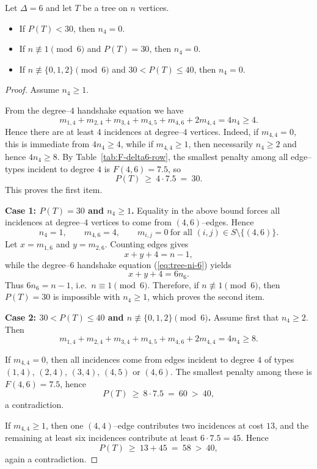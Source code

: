 \documentclass[10pt,a4paper]{amsart}
\begin{document}
\begin{lemma}
\label{lem:no4-threshold}
Let $\Delta=6$ and let $T$ be a tree on $n$ vertices.

\begin{itemize}
\item If $P(T)<30$, then $n_4=0$.
\item If $n\not\equiv 1 \pmod 6$ and $P(T)=30$, then $n_4=0$.
\item If $n\not\equiv \{0,1,2\} \pmod 6$ and $30<P(T)\le 40$, then $n_4=0$.
\end{itemize}
\end{lemma}

\begin{proof}
Assume $n_4\ge 1$.

From the degree--$4$ handshake equation we have
\[
m_{1,4}+m_{2,4}+m_{3,4}+m_{4,5}+m_{4,6}+2m_{4,4}=4n_4 \ge 4 .
\]
Hence there are at least $4$ incidences at degree--$4$ vertices. 
Indeed, if $m_{4,4}=0$, this is immediate from $4n_4\ge 4$, while if
$m_{4,4}\ge 1$, then necessarily $n_4\ge 2$ and hence $4n_4\ge 8$.
By Table~\ref{tab:F-delta6-row}, the smallest penalty among all edge--types
incident to degree $4$ is $F(4,6)=7.5$, so
\[
P(T)\ \ge\ 4\cdot 7.5 \ =\ 30 .
\]
This proves the first item.

\medskip
\noindent
\textbf{Case 1: $P(T)=30$ and $n_4\ge 1$.}  
Equality in the above bound forces all incidences at degree--$4$ vertices
to come from $(4,6)$--edges. Hence
\[
n_4=1, \qquad m_{4,6}=4, \qquad m_{i,j}=0 \ \text{for all }(i,j)\in S\setminus\{(4,6)\}.
\]
Let $x=m_{1,6}$ and $y=m_{2,6}$.  
Counting edges gives
\[
x+y+4=n-1 ,
\]
while the degree--$6$ handshake equation (\ref{eq:tree-ni-6}) yields
\[
x+y+4=6n_6 .
\]
Thus $6n_6=n-1$, i.e.\ $n\equiv 1\pmod 6$.  
Therefore, if $n\not\equiv 1\pmod 6$, then $P(T)=30$ is impossible with $n_4\ge 1$,
which proves the second item.

\medskip
\noindent
\textbf{Case 2: $30<P(T)\le 40$ and $n\not\equiv\{0,1,2\}\pmod 6$.}  
Assume first that $n_4\ge 2$. Then
\[
m_{1,4}+m_{2,4}+m_{3,4}+m_{4,5}+m_{4,6}+2m_{4,4}=4n_4 \ge 8 .
\]

If $m_{4,4}=0$, then all incidences come from edges incident to degree $4$
of types $(1,4)$, $(2,4)$, $(3,4)$, $(4,5)$ or $(4,6)$.  
The smallest penalty among these is $F(4,6)=7.5$, hence
\[
P(T)\ \ge\ 8\cdot 7.5 \ =\ 60 \ >\ 40 ,
\]
a contradiction.

If $m_{4,4}\ge 1$, then one $(4,4)$--edge contributes two incidences at cost $13$,
and the remaining at least six incidences contribute at least $6\cdot 7.5=45$.
Hence
\[
P(T)\ \ge\ 13 + 45 \ =\ 58 \ >\ 40 ,
\]
again a contradiction.


\end{proof}
\end{document}
